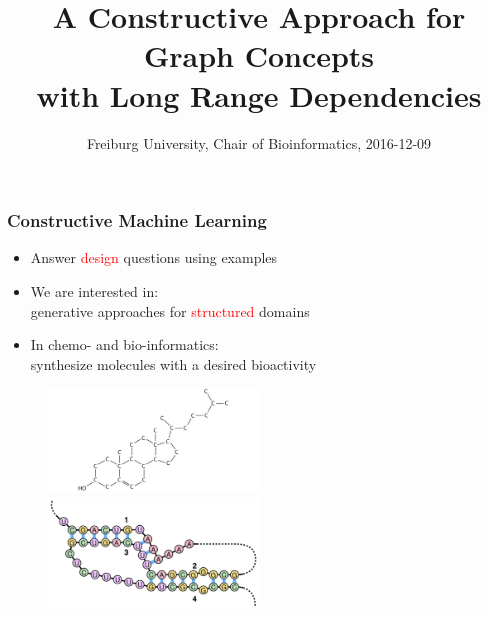 \documentclass{beamer}
\title 
{A Constructive Approach for Graph Concepts \\
with Long Range Dependencies}
\author %
{\underline{Stefan Mautner} \and Fabrizio Costa
    \small{ 
        \texttt{
            \href{mailto:mautner@informatik.uni-freiburg.de}
            {mautner@informatik.uni-freiburg.de}}
        \texttt{
            \href{mailto:costa@informatik.uni-freiburg.de}
            {costa@informatik.uni-freiburg.de}}}
}
\date 
{Freiburg University, Chair of Bioinformatics, 2016-12-09}
\newcommand{\red}[1]{\textcolor{red}{#1}}
\begin{document}
\frame{\titlepage}



\begin{frame}
\frametitle{Constructive Machine Learning}

    \begin{itemize}
        \item Answer \red{design} questions using examples
        \item We are interested in: \\generative approaches for \red{structured} domains
        \item In chemo- and bio-informatics: \\synthesize molecules with a desired bioactivity
    \end{itemize}
    \begin{figure}
        \centering
        \includegraphics[width=0.5\textwidth]{images/mol.jpg}
        \includegraphics[width=0.5\textwidth]{images/rna.png}
    \end{figure}    
\end{frame}
\end{document}
